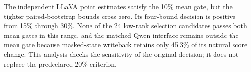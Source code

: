 The independent LLaVA point estimates satisfy the 10\% mean gate, but the tighter paired-bootstrap bounds cross zero. Its four-bound decision is positive from 15\% through 30\%. None of the 24 low-rank selection candidates passes both mean gates in this range, and the matched Qwen interface remains outside the mean gate because masked-state writeback retains only 45.3\% of its natural score change. This analysis checks the sensitivity of the original decision; it does not replace the predeclared 20\% criterion.
